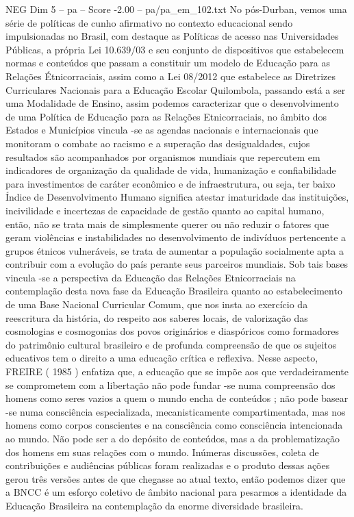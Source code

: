 \begin{textsample}{NEG Dim 5 – pa – Score -2.00 – pa/pa\_em\_102.txt}
No pós-Durban, vemos uma série de políticas de cunho afirmativo no contexto educacional sendo impulsionadas no Brasil, com destaque as Políticas de acesso nas Universidades Públicas, a própria Lei 10.639/03 e seu conjunto de dispositivos que estabelecem normas e conteúdos que passam a constituir um modelo de Educação para as Relações Étnicorraciais, assim como a Lei 08/2012 que estabelece as Diretrizes Curriculares Nacionais para a Educação Escolar Quilombola, passando está a ser uma Modalidade de Ensino, assim podemos caracterizar que o desenvolvimento de uma Política de Educação para as Relações Etnicorraciais, no âmbito dos Estados e Municípios vincula -se as agendas nacionais e internacionais que monitoram o combate ao racismo e a superação das desigualdades, cujos resultados são acompanhados por organismos mundiais que repercutem em indicadores de organização da qualidade de vida, humanização e confiabilidade para investimentos de caráter econômico e de infraestrutura, ou seja, ter baixo Índice de Desenvolvimento Humano significa atestar imaturidade das instituições, incivilidade e incertezas de capacidade de gestão quanto ao capital humano, então, não se trata mais de simplesmente querer ou não reduzir o fatores que geram violências e instabilidades no desenvolvimento de indivíduos pertencente a grupos étnicos vulneráveis, se trata de aumentar a população socialmente apta a contribuir com a evolução do país perante seus parceiros mundiais.
Sob tais bases vincula -se a perspectiva da Educação das Relações Etnicorraciais na contemplação desta nova fase da Educação Brasileira quanto ao estabelecimento de uma Base Nacional Curricular Comum, que nos insta ao exercício da reescritura da história, do respeito aos saberes locais, de valorização das cosmologias e cosmogonias dos povos originários e diaspóricos como formadores do patrimônio cultural brasileiro e de profunda compreensão de que os sujeitos educativos tem o direito a uma educação crítica e reflexiva.
Nesse aspecto, FREIRE ( 1985 ) enfatiza que, a educação que se impõe aos que verdadeiramente se comprometem com a libertação não pode fundar -se numa compreensão dos homens como seres vazios a quem o mundo encha de conteúdos ; não pode basear -se numa consciência especializada, mecanisticamente compartimentada, mas nos homens como corpos conscientes e na consciência como consciência intencionada ao mundo.
Não pode ser a do depósito de conteúdos, mas a da problematização dos homens em suas relações com o mundo.
Inúmeras discussões, coleta de contribuições e audiências públicas foram realizadas e o produto dessas ações gerou três versões antes de que chegasse ao atual texto, então podemos dizer que a BNCC é um esforço coletivo de âmbito nacional para pesarmos a identidade da Educação Brasileira na contemplação da enorme diversidade brasileira.

\end{textsample}
